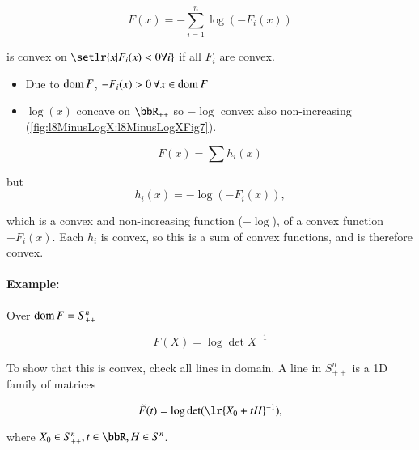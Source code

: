 \begin{equation}\label{eqn:convexOptimizationLecture8:300}
F(x) = - \sum_{i = 1}^n \log( -F_i(x) )
\end{equation}

is convex on \( \setlr{ x | F_i(x) < 0 \forall i } \) if all \( F_i \) are convex.

\begin{itemize}
\item Due to \( \operatorname{dom} F \), \( -F_i(x) > 0 \,\forall x \in \operatorname{dom} F \)
\item \( \log(x) \) concave on \( \bbR_{++} \) so \( -\log \) convex also non-increasing (\cref{fig:l8MinusLogX:l8MinusLogXFig7}).


\end{itemize}

\begin{equation}\label{eqn:convexOptimizationLecture8:320}
F(x) = \sum h_i(x)
\end{equation}

but
\begin{equation}\label{eqn:convexOptimizationLecture8:340}
h_i(x) = -\log(-F_i(x)),
\end{equation}

which is a convex and non-increasing function (\(-\log\)), of a convex function \( -F_i(x) \).  Each 
\( h_i \) is convex, so this is a sum of convex functions, and is therefore convex.

\paragraph{Example:}

Over \( \operatorname{dom} F = S^n_{++} \)

\begin{equation}\label{eqn:convexOptimizationLecture8:360}
F(X) = \log \det X^{-1}
\end{equation}

To show that this is convex, check all lines in domain.  A line in \( S^n_{++} \) is a 1D family of matrices

\begin{equation}\label{eqn:convexOptimizationLecture8:380}
\tilde{F}(t) = \log \det( \lr{X_0 + t H}^{-1} ),
\end{equation}

where \( X_0 \in S^n_{++}, t \in \bbR, H \in S^n \).

